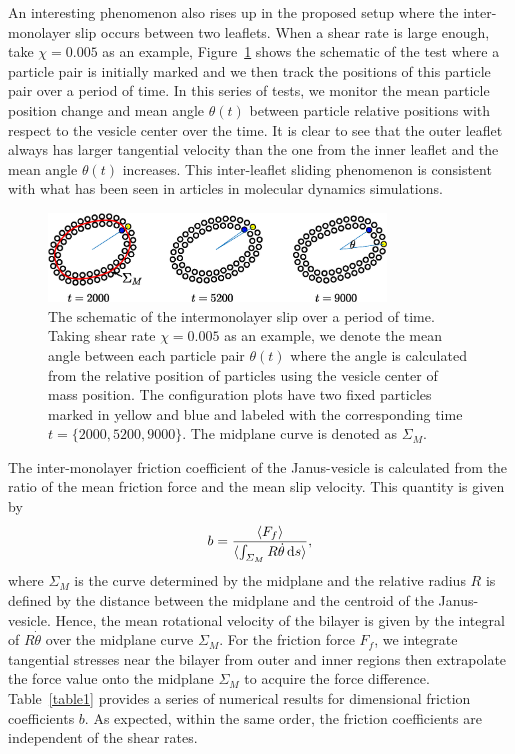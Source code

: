 \documentclass[lineno]{jfm}
\begin{document}
An interesting phenomenon also rises up in the proposed setup where the inter-monolayer slip occurs 
between two leaflets. When a shear rate is large enough, take $\chi = 0.005$ as an example, 
Figure~\ref{figure5} shows the schematic of the test where a particle pair is initially marked and we then track the positions of this particle pair over a period of time. 
In this series of tests, we monitor the mean particle position change and mean angle $\theta(t)$ between particle relative positions with respect to the vesicle center over the time. It is clear to see that the outer leaflet always has larger tangential velocity than the one from the inner leaflet and the mean angle $\theta(t)$ increases. This inter-leaflet sliding phenomenon is consistent with what has been seen
in articles in molecular dynamics simulations.

%


\begin{figure}
\begin{center}
\includegraphics[width=0.8\textwidth]{Slip.eps}
\end{center} 
  \caption{The schematic of the intermonolayer slip over a period of time. Taking shear rate $\chi=0.005$ as an example, we denote the mean angle between each particle pair $\theta(t)$ where the angle is calculated from the relative position of particles using the vesicle center of mass position. The configuration plots have two fixed particles marked in yellow and blue and labeled with the corresponding time $t=\{2000,5200,9000\}$. The midplane curve is denoted as $\Sigma_M$.
  }
    \label{figure5}
\end{figure}



The inter-monolayer friction coefficient of the Janus-vesicle is calculated from the ratio of the mean friction force and the mean slip velocity. This quantity is given by 
\begin{equation}
b = \frac{\langle F_f\rangle}{\langle\int_{\Sigma_M} R \dot\theta \dif s\rangle},
\end{equation}
%
where $\Sigma_M$ is the curve determined by the midplane and the relative radius $R$ is defined by the distance between the midplane and the centroid of the Janus-vesicle. Hence, the mean rotational velocity 
of the bilayer is given by the integral of $R\dot\theta$ over the midplane curve $\Sigma_M$.
For the friction force $F_f$, we integrate tangential stresses near the bilayer from outer and inner regions then 
extrapolate the force value onto the midplane $\Sigma_M$ to acquire the force difference. 
Table~\ref{table1} provides a series of numerical results for dimensional friction coefficients $b$. As expected,
within the same order, the friction coefficients are independent of the shear rates.
\end{document}
